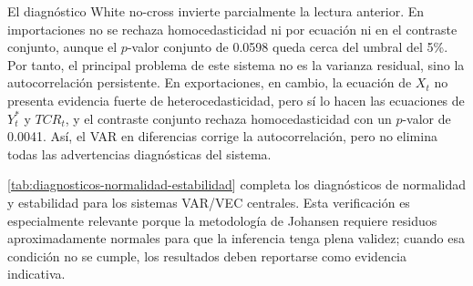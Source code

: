 \documentclass[11pt,a4paper]{article}
\begin{document}
	El diagnóstico White no-cross invierte parcialmente la lectura anterior. En
	importaciones no se rechaza homocedasticidad ni por ecuación ni en el contraste
	conjunto, aunque el \(p\)-valor conjunto de 0.0598 queda cerca del umbral del
	5\%. Por tanto, el principal problema de este sistema no es la varianza
	residual, sino la autocorrelación persistente. En exportaciones, en cambio, la
	ecuación de \(X_t\) no presenta evidencia fuerte de heterocedasticidad, pero sí
	lo hacen las ecuaciones de \(Y_t^*\) y \(TCR_t\), y el contraste conjunto
	rechaza homocedasticidad con un \(p\)-valor de 0.0041. Así, el VAR en
	diferencias corrige la autocorrelación, pero no elimina todas las advertencias
	diagnósticas del sistema.

\autoref{tab:diagnosticos-normalidad-estabilidad} completa los diagnósticos de
normalidad y estabilidad para los sistemas VAR/VEC centrales. Esta verificación
es especialmente relevante porque la metodología de Johansen requiere residuos
aproximadamente normales para que la inferencia tenga plena validez; cuando esa
condición no se cumple, los resultados deben reportarse como evidencia
indicativa.

\begin{table}[H]
\centering
\caption{Diagnósticos complementarios de normalidad y estabilidad.}
\label{tab:diagnosticos-normalidad-estabilidad}
\scriptsize
{}
\caption*{\footnotesize Nota: la estabilidad se evalúa por el módulo máximo de
las raíces del VAR; valores menores que uno indican estabilidad. Fuente:
.}
\end{table}
\end{document}
